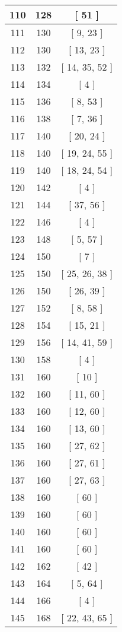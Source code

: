 \begin{center}
\begin{longtable}[H]{|| c c c ||}
\hline
110 & 128 & [ 51 ] \\ 
\hline
111 & 130 & [ 9, 23 ] \\ 
\hline
112 & 130 & [ 13, 23 ] \\ 
\hline
113 & 132 & [ 14, 35, 52 ] \\ 
\hline
114 & 134 & [ 4 ] \\ 
\hline
115 & 136 & [ 8, 53 ] \\ 
\hline
116 & 138 & [ 7, 36 ] \\ 
\hline
117 & 140 & [ 20, 24 ] \\ 
\hline
118 & 140 & [ 19, 24, 55 ] \\ 
\hline
119 & 140 & [ 18, 24, 54 ] \\ 
\hline
120 & 142 & [ 4 ] \\ 
\hline
121 & 144 & [ 37, 56 ] \\ 
\hline
122 & 146 & [ 4 ] \\ 
\hline
123 & 148 & [ 5, 57 ] \\ 
\hline
124 & 150 & [ 7 ] \\ 
\hline
125 & 150 & [ 25, 26, 38 ] \\ 
\hline
126 & 150 & [ 26, 39 ] \\ 
\hline
127 & 152 & [ 8, 58 ] \\ 
\hline
128 & 154 & [ 15, 21 ] \\ 
\hline
129 & 156 & [ 14, 41, 59 ] \\ 
\hline
130 & 158 & [ 4 ] \\ 
\hline
131 & 160 & [ 10 ] \\ 
\hline
132 & 160 & [ 11, 60 ] \\ 
\hline
133 & 160 & [ 12, 60 ] \\ 
\hline
134 & 160 & [ 13, 60 ] \\ 
\hline
135 & 160 & [ 27, 62 ] \\ 
\hline
136 & 160 & [ 27, 61 ] \\ 
\hline
137 & 160 & [ 27, 63 ] \\ 
\hline
138 & 160 & [ 60 ] \\ 
\hline
139 & 160 & [ 60 ] \\ 
\hline
140 & 160 & [ 60 ] \\ 
\hline
141 & 160 & [ 60 ] \\ 
\hline
142 & 162 & [ 42 ] \\ 
\hline
143 & 164 & [ 5, 64 ] \\ 
\hline
144 & 166 & [ 4 ] \\ 
\hline
145 & 168 & [ 22, 43, 65 ] \\ 

\end{longtable}
\end{center}
